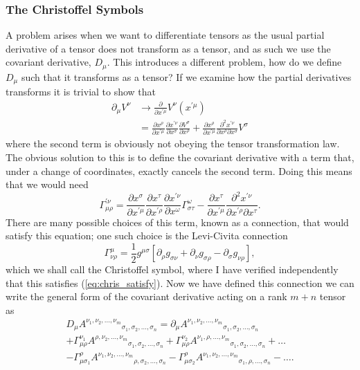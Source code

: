 \documentclass[12pt]{article}
\numberwithin{equation}{section}
\numberwithin{figure}{section}
\begin{document}
\subsubsection{The Christoffel Symbols} %
\label{subsub:the_christoffel_symbolse}
A problem arises when we want to differentiate tensors as the usual partial derivative of a tensor does not transform as a tensor, and as such we use the covariant derivative, $D_\mu$. This introduces a different problem, how do we define $D_\mu$ such that it transforms as a tensor? If we examine how the partial derivatives transforms it is trivial to show that 
\begin{align}
	\partial_\mu V^\nu &\rightarrow \frac{\partial}{\partial x^{\prime\mu}} V^\nu(x^{\prime\mu})\\
	&= \frac{\partial x^\rho}{\partial x^{\prime\mu}} \frac{\partial x^{\prime\nu}}{\partial x^\sigma} \frac{\partial V^\sigma}{\partial x^\rho} + \frac{\partial x^\rho}{\partial x^{\prime\mu}}\frac{\partial^2 x^{\prime\nu}}{\partial x^\rho \partial x^\sigma}V^\sigma
\end{align}
where the second term is obviously not obeying the tensor transformation law. The obvious solution to this is to define the covariant derivative with a term that, under a change of coordinates, exactly cancels the second term. Doing this means that we would need
\begin{equation}
	\Gamma^{\prime\nu}_{\mu\rho} = \frac{\partial x^\sigma}{\partial x^{\prime\mu}} \frac{\partial x^\tau}{\partial x^{\prime\rho}} \frac{\partial x^{\prime\nu}}{\partial x^\omega}\Gamma^{\omega}_{\sigma\tau} - \frac{\partial x^\tau}{\partial x^{\prime\mu}}\frac{\partial^2 x^{\prime\nu}}{\partial x ^{\prime\rho}  \partial x^\tau}. \label{eq:chris_satisfy}
\end{equation}
There are many possible choices of this term, known as a connection, that would satisfy this equation; one such choice is the Levi-Civita connection
\begin{equation}
	\Gamma^{\mu}_{\nu\rho}=\frac{1}{2}g^{\mu\sigma}[\partial_\rho g_{\sigma\nu} + \partial_\nu g_{\sigma\rho} - \partial_\sigma g_{\nu\rho}], \label{eq:Christoffel_symbol}
\end{equation}
which we shall call the Christoffel symbol, where I have verified independently that this satisfies (\ref{eq:chris_satisfy}). Now we have defined this connection we can write the general form of the covariant derivative acting on a rank $m+n$ tensor as 
\begin{multline}
	D_\mu {A^{\nu_1,\nu_2,...,\nu_m}}_{\sigma_1,\sigma_2,\dots,\sigma_n}  = \partial_\mu{A^{\nu_1,\nu_2,...,\nu_m}}_{\sigma_1,\sigma_2,\dots,\sigma_n} \\+ \Gamma^{\nu_1}_{\mu\rho}{A^{\rho,\nu_2,\dots,\nu_m}}_{\sigma_1,\sigma_2,\dots,\sigma_n} + \Gamma^{\nu_2}_{\mu\rho}{A^{\nu_1,\rho,...,\nu_m}}_{\sigma_1,\sigma_2,\dots,\sigma_n} + \dots \\
	 - \Gamma^{\rho}_{\mu\sigma_1}{A^{\nu_1,\nu_2,\dots,\nu_m}}_{\rho,\sigma_2,\dots,\sigma_n} - \Gamma^{\rho}_{\mu\sigma_2}{A^{\nu_1,\nu_2,\dots,\nu_m}}_{\sigma_1,\rho,\dots,\sigma_n} - \dots.
\end{multline}
\end{document}
